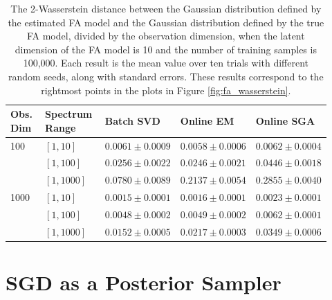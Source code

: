 \documentclass[msc,deptreport.inf]{infthesis} %
\begin{document}
\begin{table}[h!]
	\begin{center}
		\begin{tabular}{|| p{0.12\linewidth} p{0.20\linewidth} p{0.20\linewidth} p{0.20\linewidth} p{0.20\linewidth} ||} 
 			\hline
 			Obs. Dim & Spectrum Range & Batch SVD & Online EM & Online SGA \\ [0.5ex] 
 			\hline\hline
			100 	& $[1, 10]$ 	& $0.0061 \pm 0.0009$ 	& $0.0058 \pm 0.0006$ 	& $0.0062 \pm 0.0004$ \\ 
				& $[1, 100]$ 	& $0.0256 \pm 0.0022$ 	& $0.0246 \pm 0.0021$ 	& $0.0446 \pm 0.0018$ \\ 
				& $[1, 1000]$	& $0.0780 \pm 0.0089$ 	& $0.2137 \pm 0.0054$ 	& $0.2855 \pm 0.0040$ \\ 
			\hline
			1000	& $[1, 10]$ 	& $0.0015 \pm 0.0001$ 	& $0.0016 \pm 0.0001$ 	& $0.0023 \pm 0.0001$ \\ 
				& $[1, 100]$ 	& $0.0048 \pm 0.0002$ 	& $0.0049 \pm 0.0002$ 	& $0.0062 \pm 0.0001$ \\ 
				& $[1, 1000]$ 	& $0.0152 \pm 0.0005$ 	& $0.0217 \pm 0.0003$ 	& $0.0349 \pm 0.0006$ \\ [1ex] 
			\hline
		\end{tabular}
		\caption{The 2-Wasserstein distance between the Gaussian distribution defined by the estimated FA model and the Gaussian distribution defined by the true FA model, divided by the observation dimension, when the latent dimension of the FA model is 10 and the number of training samples is 100,000. Each result is the mean value over ten trials with different random seeds, along with standard errors. These results correspond to the rightmost points in the plots in Figure \ref{fig:fa_wasserstein}.}
		\label{table:fa_wasserstein}
	\end{center}
\end{table}


 \section{SGD as a Posterior Sampler}\label{app:sgd_iterates}
\end{document}
